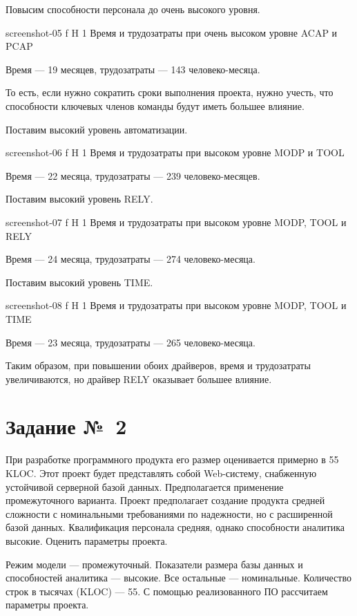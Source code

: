 \documentclass{bmstu}
\begin{document}
Повысим способности персонала до очень высокого уровня. 

    {screenshot-05}
    {f}
    {H}
    {1\textwidth}
    {Время и трудозатраты при очень высоком уровне ACAP и PCAP}
    
Время --- 19 месяцев, трудозатраты --- 143 человеко-месяца.

То есть, если нужно сократить сроки выполнения проекта, нужно учесть, что способности ключевых членов команды будут иметь большее влияние.

Поставим высокий уровень автоматизации. 

    {screenshot-06}
    {f}
    {H}
    {1\textwidth}
    {Время и трудозатраты при высоком уровне MODP и TOOL}
    
Время --- 22 месяца, трудозатраты --- 239 человеко-месяцев.

Поставим высокий уровень RELY.

    {screenshot-07}
    {f}
    {H}
    {1\textwidth}
    {Время и трудозатраты при высоком уровне MODP, TOOL и RELY}
    
Время --- 24 месяца, трудозатраты --- 274 человеко-месяца.

Поставим высокий уровень TIME.

    {screenshot-08}
    {f}
    {H}
    {1\textwidth}
    {Время и трудозатраты при высоком уровне MODP, TOOL и TIME}
    
Время --- 23 месяца, трудозатраты --- 265 человеко-месяца.

Таким образом, при повышении обоих драйверов, время и трудозатраты увеличиваются, но драйвер RELY оказывает большее влияние. 

\section{Задание №~2}

При разработке программного продукта его размер оценивается
примерно в 55 KLOC. 
Этот проект будет представлять собой Web-систему, снабженную устойчивой серверной базой данных. 
Предполагается применение промежуточного варианта. 
Проект предполагает создание продукта средней сложности с номинальными
требованиями по надежности, но с расширенной базой данных. 
Квалификация персонала средняя, однако способности аналитика высокие. 
Оценить параметры проекта.

Режим модели --- промежуточный. 
Показатели размера базы данных и способностей аналитика --- высокие. 
Все остальные --- номинальные. 
Количество строк в тысячах (KLOC) --- 55. 
С помощью реализованного ПО рассчитаем параметры проекта.
\end{document}
